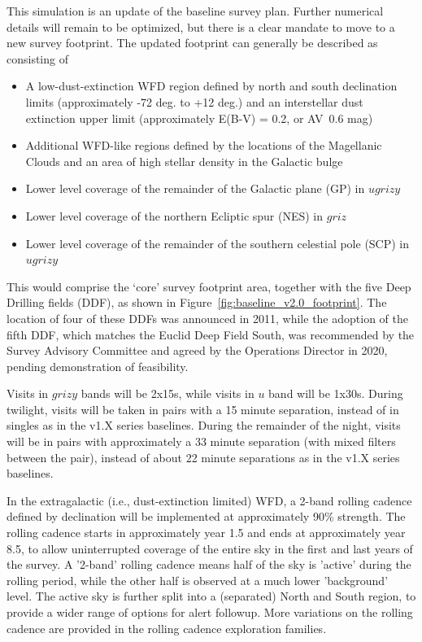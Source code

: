 This simulation is an update of the baseline survey plan. Further numerical details will remain to be optimized, but there is a clear mandate to move to a new survey footprint. The updated footprint can generally be described as consisting of 
\begin{itemize}
\item A low-dust-extinction WFD region defined by north and south declination limits (approximately -72 deg. to +12 deg.) and an interstellar dust extinction upper limit (approximately E(B-V) = 0.2, or AV~0.6 mag)
\item Additional WFD-like regions defined by the locations of the Magellanic Clouds and an area of high stellar density in the Galactic bulge 
\item Lower level coverage of the remainder of the Galactic plane (GP) in $ugrizy$
\item Lower level coverage of the northern Ecliptic spur (NES) in $griz$ 
\item Lower level coverage of the remainder of the southern celestial pole (SCP) in $ugrizy$
\end{itemize}
This would comprise the ‘core’ survey footprint area, together with the five Deep Drilling fields (DDF), as shown in Figure~\ref{fig:baseline_v2.0_footprint}. The location of four of these DDFs was announced in 2011, while the adoption of the fifth DDF, which matches the Euclid Deep Field South, was recommended by the Survey Advisory Committee and agreed by the Operations Director in 2020, pending demonstration of feasibility. 

Visits in $grizy$ bands will be 2x15s, while visits in $u$ band will be 1x30s. During twilight, visits will be taken in pairs with a 15 minute separation, instead of in singles as in the v1.X series baselines. During the remainder of the night, visits will be in pairs with approximately a 33 minute separation (with mixed filters between the pair), instead of about 22 minute separations as in the v1.X series baselines.

In the extragalactic (i.e., dust-extinction limited) WFD, a 2-band rolling cadence defined by declination will be implemented at approximately 90\% strength. The rolling cadence starts in approximately year 1.5 and ends at approximately year 8.5, to allow uninterrupted coverage of the entire sky in the first and last years of the survey. A '2-band' rolling cadence means half of the sky is 'active' during the rolling period, while the other half is observed at a much lower 'background' level. The active sky is further split into a (separated) North and South region, to provide a wider range of options for alert followup. More variations on the rolling cadence are provided in the rolling cadence exploration families.

